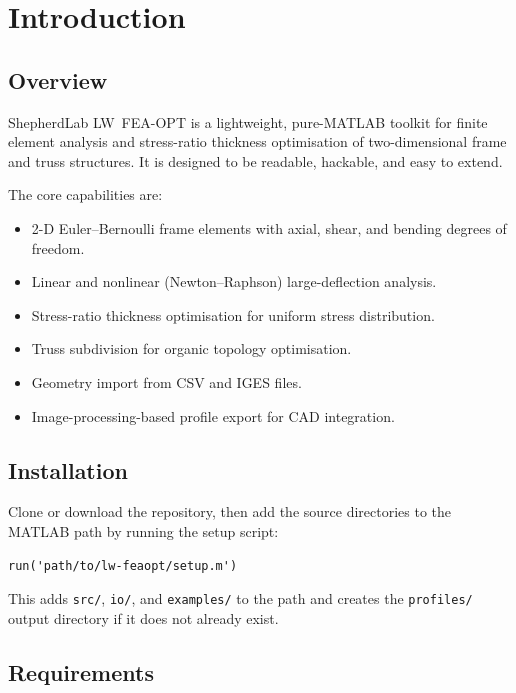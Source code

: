 \chapter{Introduction}
\label{ch:introduction}

\section{Overview}

ShepherdLab LW~FEA-OPT is a lightweight, pure-MATLAB toolkit for
finite element analysis and stress-ratio thickness optimisation of
two-dimensional frame and truss structures.  It is designed to be readable,
hackable, and easy to extend.

The core capabilities are:

\begin{itemize}[nosep]
    \item 2-D Euler--Bernoulli frame elements with axial, shear, and bending
          degrees of freedom.
    \item Linear and nonlinear (Newton--Raphson) large-deflection analysis.
    \item Stress-ratio thickness optimisation for uniform stress distribution.
    \item Truss subdivision for organic topology optimisation.
    \item Geometry import from CSV and IGES files.
    \item Image-processing-based profile export for CAD integration.
\end{itemize}

\section{Installation}

Clone or download the repository, then add the source directories to the
MATLAB path by running the setup script:

\begin{lstlisting}
run('path/to/lw-feaopt/setup.m')
\end{lstlisting}

This adds \texttt{src/}, \texttt{io/}, and \texttt{examples/} to the path and
creates the \texttt{profiles/} output directory if it does not already exist.

\section{Requirements}

